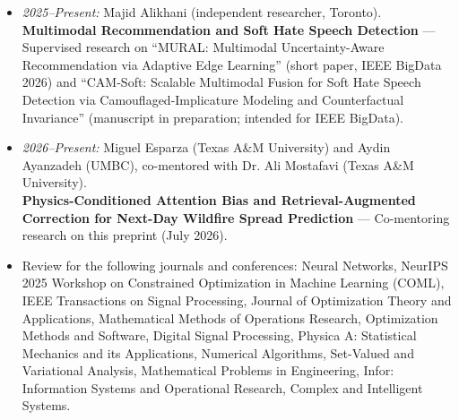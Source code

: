 \documentclass[letterpaper,11pt]{article}
\newcommand{\resitem}[1]{\item #1 \vspace{-2pt}}
\newcommand{\resheading}[1]{\par\vspace{0.6em}\noindent{\large\textbf{#1}}\par\vspace{0.25em}}
\begin{document}
\begin{itemize}
\begin{itemize}
            \item \textit{2025--Present:} Majid Alikhani (independent researcher, Toronto). \\
                \textbf{Multimodal Recommendation and Soft Hate Speech Detection} --- Supervised research on ``MURAL: Multimodal Uncertainty-Aware Recommendation via Adaptive Edge Learning'' (short paper, IEEE BigData 2026) and ``CAM-Soft: Scalable Multimodal Fusion for Soft Hate Speech Detection via Camouflaged-Implicature Modeling and Counterfactual Invariance'' (manuscript in preparation; intended for IEEE BigData).

            \item \textit{2026--Present:} Miguel Esparza (Texas A\&M University) and Aydin Ayanzadeh (UMBC), co-mentored with Dr. Ali Mostafavi (Texas A\&M University). \\
                \textbf{Physics-Conditioned Attention Bias and Retrieval-Augmented Correction for Next-Day Wildfire Spread Prediction} --- Co-mentoring research on this preprint (July 2026).
        \end{itemize}
\end{itemize}
\resheading{ \LARGE{Review Experience}}
\begin{itemize}
\resitem{Review for the following journals and conferences: Neural Networks, NeurIPS 2025 Workshop on Constrained Optimization in Machine Learning (COML), IEEE Transactions on Signal Processing, Journal of Optimization Theory and Applications, Mathematical Methods of Operations Research, Optimization Methods and Software, Digital Signal Processing, Physica A: Statistical Mechanics and its Applications, Numerical Algorithms, Set-Valued and Variational Analysis,
Mathematical Problems in Engineering, Infor: Information Systems and Operational Research, Complex and Intelligent Systems.}
\end{itemize}
\end{document}
